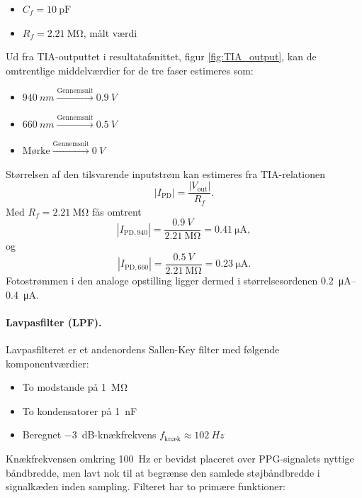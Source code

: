\begin{itemize}
    \item $C_f = \SI{10}{\pico\farad}$
    \item $R_f = \SI{2.21}{\mega\ohm}$, målt værdi
\end{itemize}

Ud fra TIA-outputtet i resultatafsnittet, figur \ref{fig:TIA_output}, kan de omtrentlige middelværdier for de tre faser estimeres som:
\begin{itemize}
    \item $\SI{940}{nm} \xrightarrow{\text{Gennemsnit}} \SI{0.9}{V}$
    \item $\SI{660}{nm} \xrightarrow{\text{Gennemsnit}} \SI{0.5}{V}$
    \item $\text{Mørke} \xrightarrow{\text{Gennemsnit}} \SI{0}{V}$
\end{itemize}

Størrelsen af den tilsvarende inputstrøm kan estimeres fra TIA-relationen
\[
    |I_{\mathrm{PD}}|=\frac{|V_{\text{out}}|}{R_f}.
\]
Med $R_f=\SI{2.21}{\mega\ohm}$ fås omtrent
\[
    |I_{\mathrm{PD},940}|=\frac{\SI{0.9}{V}}{\SI{2.21}{\mega\ohm}}=\SI{0.41}{\micro\ampere},
\]
og
\[
    |I_{\mathrm{PD},660}|=\frac{\SI{0.5}{V}}{\SI{2.21}{\mega\ohm}}=\SI{0.23}{\micro\ampere}.
\]
Fotostrømmen i den analoge opstilling ligger dermed i størrelsesordenen \SIrange{0.2}{0.4}{\micro\ampere}.

\paragraph{Lavpasfilter (LPF).}
Lavpasfilteret er et andenordens Sallen-Key filter med følgende komponentværdier:
\begin{itemize}
    \item To modstande på \SI{1}{\mega\ohm}
    \item To kondensatorer på \SI{1}{\nano\farad}
    \item Beregnet \SI{-3}{dB}-knækfrekvens $f_{\text{knæk}} \approx \SI{102}{Hz}$
\end{itemize}

Knækfrekvensen omkring \SI{100}{Hz} er bevidst placeret over PPG-signalets nyttige
båndbredde, men lavt nok til at begrænse den samlede støjbåndbredde i signalkæden inden sampling. Filteret har to primære funktioner:

